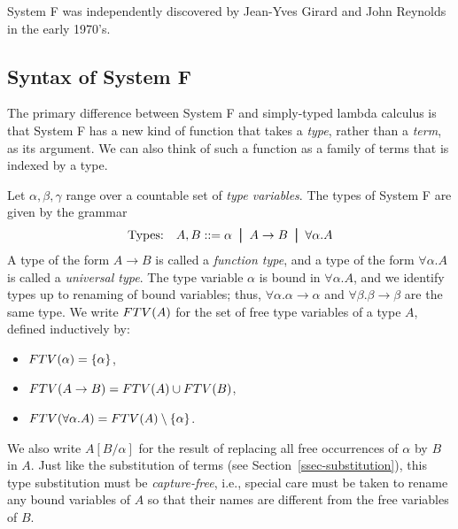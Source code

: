 \documentclass{article}
\begin{document}
System F was independently discovered by Jean-Yves Girard and John
Reynolds in the early 1970's.

\subsection{Syntax of System F}

The primary difference between System F and simply-typed lambda
calculus is that System F has a new kind of function that takes a {\em
  type}, rather than a {\em term}, as its argument. We can also think
of such a function as a family of terms that is indexed by a type.

Let $\alpha,\beta,\gamma$ range over a countable set of {\em type
  variables}. The types of System F are given by the grammar
\[ \mbox{Types:}\ssep A,B \bnf \alpha \bor A\to B\bor \forall\alpha.A
\]
A type of the form $A\to B$ is called a {\em function type}, and a
type of the form $\forall\alpha.A$ is called a {\em universal type}.
The type variable $\alpha$ is bound in $\forall\alpha.A$, and we
identify types up to renaming of bound variables; thus,
$\forall\alpha.\alpha\to\alpha$ and $\forall\beta.\beta\to\beta$ are
the same type. We write $FTV(A)$ for the set of free type variables
of a type $A$, defined inductively by: 
\begin{itemize}
\item $FTV(\alpha) = \{\alpha\}$,
\item $FTV(A\to B) = FTV(A)\cup FTV(B)$,
\item $FTV(\forall\alpha.A) = FTV(A)\setminus\{\alpha\}$.
\end{itemize}
We also write $A[B/\alpha]$ for the result of replacing all free
occurrences of $\alpha$ by $B$ in $A$. Just like the substitution of
terms (see Section~\ref{ssec-substitution}), this type substitution
must be {\em capture-free}, i.e., special care must be taken to rename
any bound variables of $A$ so that their names are different from the
free variables of $B$.
\end{document}
